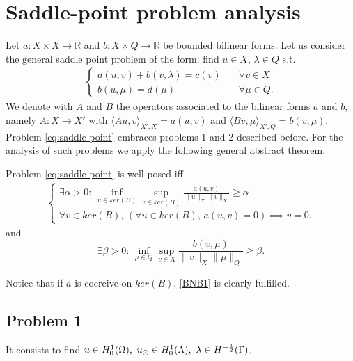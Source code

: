 \section{Saddle-point problem analysis}
Let $a: X \times X \rightarrow \mathbb{R}$ and $b: X\times Q \rightarrow \mathbb{R}$ be bounded bilinear forms. Let us consider the general saddle point problem of the form: find $u\in X$, $\lambda\in Q$ s.t.
\begin{eqnarray}\label{eq:saddle-point}
\begin{cases}
a(u,v)+b(v,\lambda)=c(v)\quad &\forall v\in X\\
b(u,\mu)=d(\mu) \quad &\forall \mu\in Q.
\end{cases}
\end{eqnarray}
We denote with $A$ and $B$ the operators associated to the bilinear forms $a$ and $b$, 
namely $A: X \longrightarrow X'$ with $\langle Au,v\rangle _{X',X} = a(u,v)$ and $\langle Bv,\mu\rangle_{X',Q} = b(v,\mu)$. Problem \eqref{eq:saddle-point} embraces problems 1 and 2 described before. For the analysis of such problems we apply the following general abstract theorem.
\begin{theorem}{\cite[Theorem 2.34]{MR2050138}}\label{th:bnb}
Problem \eqref{eq:saddle-point} is well posed iff 
\begin{eqnarray}\label{BNB1}
\begin{cases}
\exists \alpha >0 :\, \inf_{u\in ker(B)}\sup_{v\in ker(B)} \frac{a(u,v)}{\|u\|_{X}\|v\|_{X}}\geq \alpha\\
\forall v \in ker(B), \, \left( \forall u \in ker(B),\, a(u,v)=0 \right)\implies v=0.
\end{cases}
\end{eqnarray}
and 
\begin{equation}\label{eq:infsup}
\exists \beta >0:\,\inf_{\mu\in Q}\sup_{v\in X} \frac{b(v,\mu)}{\|v\|_{X}\|\mu\|_{Q}}\geq \beta .
\end{equation}
\end{theorem} 
Notice that if $a$ is coercive on $ker(B)$, \eqref{BNB1} is clearly fulfilled. \\

\subsection{Problem 1}
It consists to find $u \in H^1_0(\Omega),\ \ud \in H_0^1(\Lambda), \ \lambda \in H^{-\frac12}(\Gamma )$, %

